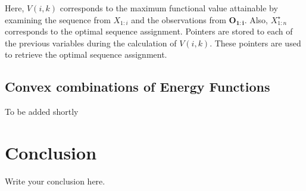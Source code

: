 \documentclass{article}
\begin{document}
Here, $V(i,k)$ corresponds to the maximum functional value attainable by examining the sequence from $X_{1:i}$ and the observations from $\mathbf{O_{1:i}}$. Also, $X^\star_{1:n}$ corresponds to the optimal sequence assignment. Pointers are stored to each of the previous variables during the calculation of $V(i,k)$. These pointers are used to retrieve the optimal sequence assignment. 


\subsection{Convex combinations of Energy Functions}
To be added shortly

\section{Conclusion}
Write your conclusion here.



\end{document}
